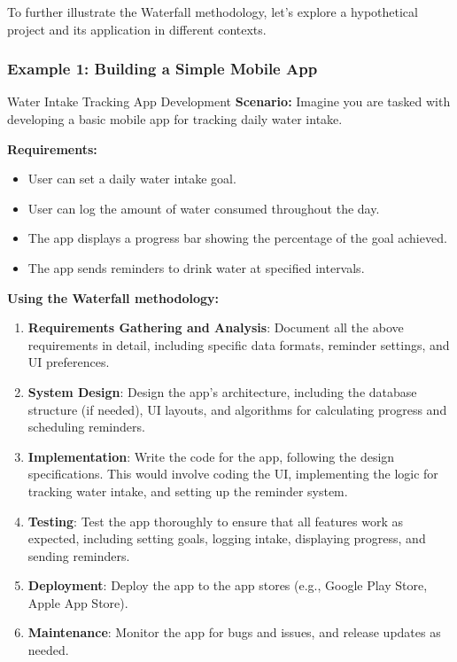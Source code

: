 To further illustrate the Waterfall methodology, let's explore a hypothetical
project and its application in different contexts.

\subsubsection{Example 1: Building a Simple Mobile App}

\begin{examplebox}{Water Intake Tracking App Development}
  \textbf{Scenario:} Imagine you are tasked with developing a basic mobile app for tracking daily water intake.

  \textbf{Requirements:}
  \begin{itemize}
    \item User can set a daily water intake goal.
    \item User can log the amount of water consumed throughout the day.
    \item The app displays a progress bar showing the percentage of the goal achieved.
    \item The app sends reminders to drink water at specified intervals.
  \end{itemize}

  \textbf{Using the Waterfall methodology:}
  \begin{enumerate}
    \item \textbf{Requirements Gathering and Analysis}: Document all the above requirements in detail, including specific data formats, reminder settings, and UI preferences.
    \item \textbf{System Design}: Design the app's architecture, including the database structure (if needed), UI layouts, and algorithms for calculating progress and scheduling reminders.
    \item \textbf{Implementation}: Write the code for the app, following the design specifications. This would involve coding the UI, implementing the logic for tracking water intake, and setting up the reminder system.
    \item \textbf{Testing}: Test the app thoroughly to ensure that all features work as expected, including setting goals, logging intake, displaying progress, and sending reminders.
    \item \textbf{Deployment}: Deploy the app to the app stores (e.g., Google Play Store, Apple App Store).
    \item \textbf{Maintenance}: Monitor the app for bugs and issues, and release updates as needed.
  \end{enumerate}
\end{examplebox}

